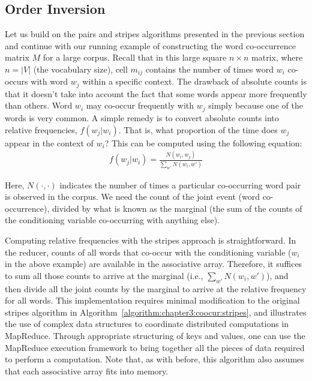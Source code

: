 \documentclass[11pt]{article}
\begin{document}
\subsection{Order Inversion}
\label{chapter3:cond-prob}

Let us build on the pairs and stripes algorithms presented in the
previous section and continue with our running example of constructing
the word co-occurrence matrix $M$ for a large corpus.  Recall that in
this large square $n \times n$ matrix, where $n=|V|$ (the vocabulary
size), cell $m_{ij}$ contains the number of times word $w_i$ co-occurs
with word $w_j$ within a specific context.  The drawback of absolute
counts is that it doesn't take into account the fact that some words
appear more frequently than others.  Word $w_i$ may co-occur
frequently with $w_j$ simply because one of the words is very common.
A simple remedy is to convert absolute counts into relative
frequencies, $f(w_j|w_i)$.  That is, what proportion of the time does
$w_j$ appear in the context of $w_i$?  This can be computed using the
following equation:
\begin{align}
f(w_j|w_i) = \frac{N(w_i,w_j)}{\sum_{w'}{N(w_i,w')}}
\end{align}

\noindent Here, $N(\cdot, \cdot)$ indicates the number of times a
particular co-occurring word pair is observed in the corpus.  We need
the count of the joint event (word co-occurrence), divided by what is
known as the marginal (the sum of the counts of the conditioning
variable co-occurring with anything else).

Computing relative frequencies with the stripes approach is
straightforward.  In the reducer, counts of all words that co-occur
with the conditioning variable ($w_i$ in the above example) are
available in the associative array.  Therefore, it suffices to sum all
those counts to arrive at the marginal (i.e., $\sum_{w'}{N(w_i,w')}$),
and then divide all the joint counts by the marginal to arrive at the
relative frequency for all words.  This implementation requires
minimal modification to the original stripes algorithm in
Algorithm~\ref{algorithm:chapter3:coocur:stripes}, and illustrates the use
of complex data structures to coordinate distributed computations in
MapReduce.  Through appropriate structuring of keys and values, one
can use the MapReduce execution framework to bring together all the
pieces of data required to perform a computation.  Note that, as with
before, this algorithm also assumes that each associative array fits
into memory.
\end{document}
